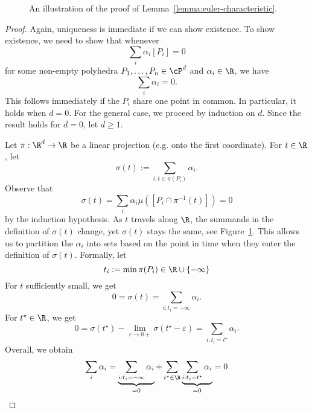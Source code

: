 \begin{figure}
  \begin{center}
  \end{center}
  \caption{An illustration of the proof of Lemma~\ref{lemma:euler-characteristic}.}
  \label{fig:proof-euler-characteristic}
\end{figure}
\begin{proof}
  Again, uniqueness is immediate if we can show existence.
  To show existence, we need to show that whenever
  \[
    \sum_i \alpha_i [P_i] = 0
  \]
  for some non-empty polyhedra $P_1, \ldots, P_n \in \cP^d$ and $\alpha_i \in \R$,
  we have
  \[
    \sum_i \alpha_i = 0.
  \]
  This follows immediately if the $P_i$ share one point in common.
  In particular, it holds when $d = 0$.
  For the general case, we proceed by induction on $d$.
  Since the result holds for $d = 0$, let $d \geq 1$.

  Let $\pi : \R^d \to \R$ be a linear projection (e.g. onto the first coordinate).
  For $t \in \R$, let
  \[
    \sigma(t) := \sum_{i : t \in \pi(P_i)} \alpha_i.
  \]
  Observe that
  \[
    \sigma(t) = \sum_i \alpha_i \mu([P_i \cap \pi^{-1}(t)]) = 0
  \]
  by the induction hypothesis.
  As $t$ travels along $\R$,
  the summands in the definition of $\sigma(t)$ change,
  yet $\sigma(t)$ stays the same, see Figure~\ref{fig:proof-euler-characteristic}.
  This allows us to partition the $\alpha_i$ into sets based on the point in time when they enter the definition of $\sigma(t)$.
  Formally, let
  \[
     t_i := \min\pi(P_i) \in \R \cup \{ -\infty \}
  \]
  For $t$ sufficiently small,
  we get
  \[
    0 = \sigma(t) = \sum_{i : t_i = -\infty} \alpha_i.
  \]
  For $t^\star \in \R$, we get
  \[
    0 = \sigma(t^\star) - \lim_{\varepsilon \to 0+} \sigma(t^\star - \varepsilon) = \sum_{i: t_i = t^\star} \alpha_i.
  \]
  Overall, we obtain
  \[
    \sum_i \alpha_i = \underbrace{\sum_{i : t_i = -\infty} \alpha_i}_{=0} + \sum_{t^\star \in \R} \underbrace{\sum_{i: t_i = t^\star} \alpha_i}_{=0} = 0 \qedhere
  \]
\end{proof}



